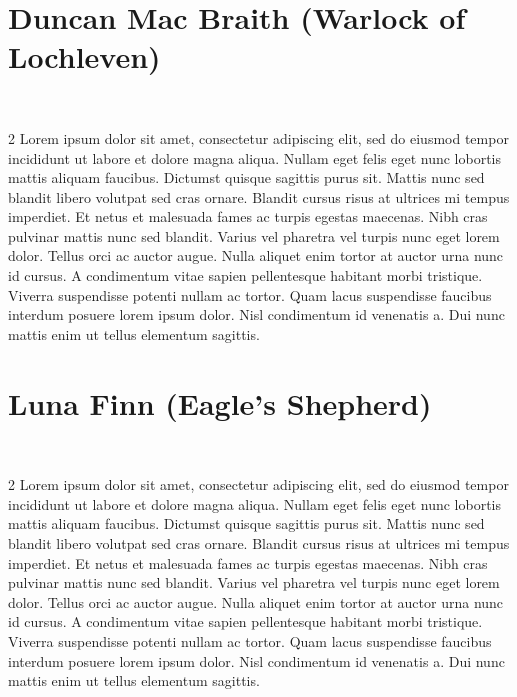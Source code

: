 \section*{Duncan Mac Braith (Warlock of Lochleven)}\label{char:DuncanMacBraith}%
\vspace*{-2.4\fontdimen6\font}\hfill\\\begin{multicols}{2}%
	{\noindent\entryfont Lorem ipsum dolor sit amet, consectetur adipiscing elit, sed do eiusmod tempor incididunt ut labore et dolore magna aliqua. Nullam eget felis eget nunc lobortis mattis aliquam faucibus. Dictumst quisque sagittis purus sit. Mattis nunc sed blandit libero volutpat sed cras ornare. Blandit cursus risus at ultrices mi tempus imperdiet. Et netus et malesuada fames ac turpis egestas maecenas. Nibh cras pulvinar mattis nunc sed blandit. Varius vel pharetra vel turpis nunc eget lorem dolor. Tellus orci ac auctor augue. Nulla aliquet enim tortor at auctor urna nunc id cursus. A condimentum vitae sapien pellentesque habitant morbi tristique. Viverra suspendisse potenti nullam ac tortor. Quam lacus suspendisse faucibus interdum posuere lorem ipsum dolor. Nisl condimentum id venenatis a. Dui nunc mattis enim ut tellus elementum sagittis.}
\end{multicols}%

\newpage
\section*{Luna Finn (Eagle's Shepherd)}\label{char:EagleShepherd}%
\vspace*{-2.4\fontdimen6\font}\hfill\\\begin{multicols}{2}%
	{\noindent\entryfont Lorem ipsum dolor sit amet, consectetur adipiscing elit, sed do eiusmod tempor incididunt ut labore et dolore magna aliqua. Nullam eget felis eget nunc lobortis mattis aliquam faucibus. Dictumst quisque sagittis purus sit. Mattis nunc sed blandit libero volutpat sed cras ornare. Blandit cursus risus at ultrices mi tempus imperdiet. Et netus et malesuada fames ac turpis egestas maecenas. Nibh cras pulvinar mattis nunc sed blandit. Varius vel pharetra vel turpis nunc eget lorem dolor. Tellus orci ac auctor augue. Nulla aliquet enim tortor at auctor urna nunc id cursus. A condimentum vitae sapien pellentesque habitant morbi tristique. Viverra suspendisse potenti nullam ac tortor. Quam lacus suspendisse faucibus interdum posuere lorem ipsum dolor. Nisl condimentum id venenatis a. Dui nunc mattis enim ut tellus elementum sagittis.}
\end{multicols}%

\twocolumn